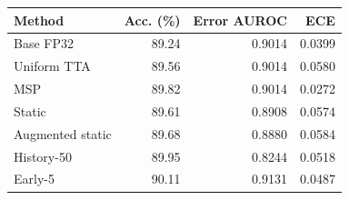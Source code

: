 \begin{tabular}{lrrr}
\toprule
Method & Acc. (\%) & Error AUROC & ECE \\
\midrule
Base FP32 & 89.24 & 0.9014 & 0.0399 \\
Uniform TTA & 89.56 & 0.9014 & 0.0580 \\
MSP & 89.82 & 0.9014 & 0.0272 \\
Static & 89.61 & 0.8908 & 0.0574 \\
Augmented static & 89.68 & 0.8880 & 0.0584 \\
History-50 & 89.95 & 0.8244 & 0.0518 \\
Early-5 & 90.11 & 0.9131 & 0.0487 \\
\bottomrule
\end{tabular}
